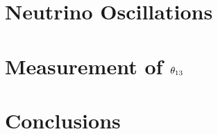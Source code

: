 \documentclass{ucbthesis}
\begin{document}
\listoftodos

\chapter{Neutrino Oscillations}










\chapter{Measurement of \texorpdfstring{$\theta_{13}$}{theta13}}
\label{ch:analysis}

\chapter{Conclusions}

\printbibliography

\appendix


\end{document}
